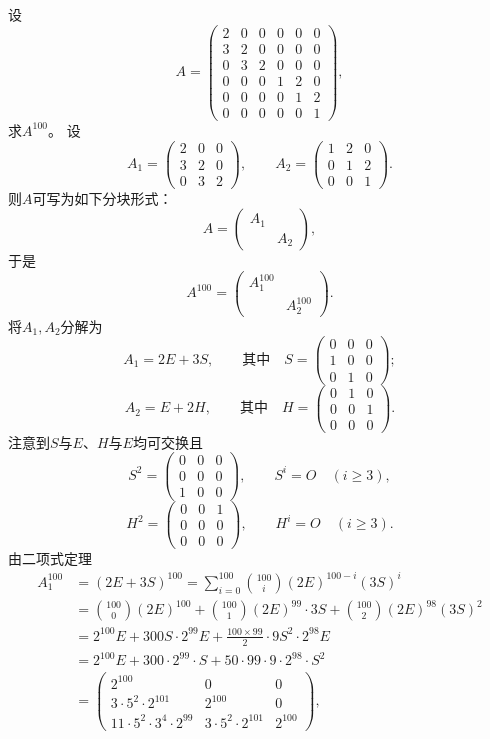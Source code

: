 设
\[
A=\begin{pmatrix}
2&0&0&0&0&0\\
3&2&0&0&0&0\\
0&3&2&0&0&0\\
0&0&0&1&2&0\\
0&0&0&0&1&2\\
0&0&0&0&0&1
\end{pmatrix},
\]
求$A^{100}$。
\sol 设
\[
A_1=\begin{pmatrix}2&0&0\\3&2&0\\0&3&2\end{pmatrix},\qquad
A_2=\begin{pmatrix}1&2&0\\0&1&2\\0&0&1\end{pmatrix}.
\]
则$A$可写为如下分块形式：
\[A=\begin{pmatrix}A_1&\\&A_2\end{pmatrix},\]
于是
\[A^{100}=\begin{pmatrix}A_1^{100}&\\&A_2^{100}\end{pmatrix}.\]
将$A_1,A_2$分解为
\[
A_1=2E+3S,\qquad\text{其中}\quad
S=\begin{pmatrix}0&0&0\\1&0&0\\0&1&0\end{pmatrix};
\]
\[
A_2=E+2H,\qquad\text{其中}\quad
H=\begin{pmatrix}0&1&0\\0&0&1\\0&0&0\end{pmatrix}.
\]
注意到$S$与$E$、$H$与$E$均可交换且
\[
S^2=\begin{pmatrix}0&0&0\\0&0&0\\1&0&0\end{pmatrix},\qquad
S^i=O\quad(i\ge3),
\]
\[
H^2=\begin{pmatrix}0&0&1\\0&0&0\\0&0&0\end{pmatrix},\qquad
H^i=O\quad(i\ge3).
\]
由二项式定理
\begin{align*}
A_1^{100}
&=(2E+3S)^{100}=\sum_{i=0}^{100}\binom{100}{i}(2E)^{100-i}(3S)^i\\
&=\binom{100}{0}(2E)^{100}
 +\binom{100}{1}(2E)^{99}\cdot3S
 +\binom{100}{2}(2E)^{98}(3S)^2\\
&=2^{100}E+300S\cdot2^{99}E
 +\frac{100\times99}{2}\cdot9S^2\cdot2^{98}E\\
&=2^{100}E+300\cdot2^{99}\cdot S+50\cdot99\cdot9\cdot2^{98}\cdot S^2\\
&=\begin{pmatrix}
2^{100}&0&0\\
3\cdot5^2\cdot2^{101}&2^{100}&0\\
11\cdot5^2\cdot3^4\cdot2^{99}&3\cdot5^2\cdot2^{101}&2^{100}
\end{pmatrix},
\end{align*}
